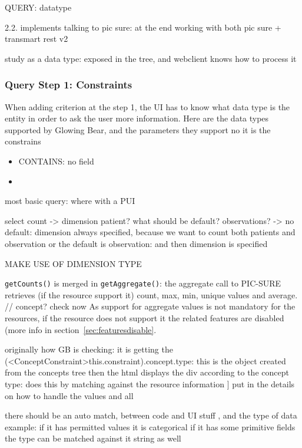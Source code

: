 QUERY: datatype


2.2. implements talking to pic sure: at the end working with both pic sure + transmart rest v2 

study as a data type: exposed in the tree, and webclient knows how to process it 

\subsubsection{Query Step 1:  Constraints}

When adding criterion at the step 1, the UI has to know what data type is the entity in order to ask the user more information. Here are the data types supported by Glowing Bear, and the parameters they support no it is the constrains
\begin{itemize}
    \item CONTAINS: no field
    \item 
\end{itemize}


most basic query: where with a PUI

select count 
-> dimension patient? what should be default? observations? 
-> no default: dimension always specified, because we want to count both patients and observation 
or the default is observation: and then dimension is specified 

MAKE USE OF DIMENSION TYPE

\verb|getCounts()| is merged in \verb|getAggregate()|: the aggregate call to PIC-SURE retrieves (if the resource support it) count, max, min, unique values and average. // concept? check now
As support for aggregate values is not mandatory for the resources, if the resource does not support it the related features are disabled (more info in section~\ref{sec:featuresdisable}.

originally how GB is checking: it is getting the (<ConceptConstraint>this.constraint).concept.type: this is the object created from the concepts tree
then the html displays the div according to the concept type: does this by matching against the resource information ]
put in the details on how to handle the values and all

there should be an auto match, between code and UI stuff , and the type of data
example: if it has permitted values it is categorical
if it has some primitive fields the type can be matched against it
string as well

